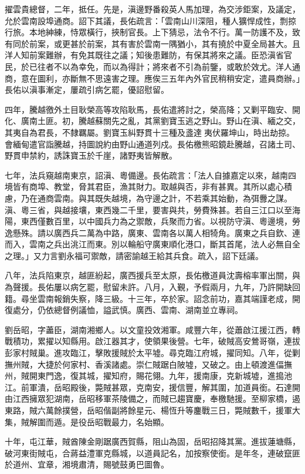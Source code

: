 \begin{pinyinscope}
擢雲貴總督，二年，抵任。先是，滇邊野番殺英人馬加理，為交涉鉅案，及議定，允於雲南設埠通商。詔下其議，長佑疏言：「雲南山川深阻，種人獷悍成性，剽掠行旅。本地紳練，恃眾橫行，挾制官長。上下猜忌，法令不行。萬一防護不及，致有同於前案，或更甚於前案，其有害於雲南一隅猶小，其有撓於中夏全局甚大。且洋人知前案難辦，有免其既往之議；知後患難防，有保其將來之議。臣恐滇省官民，於已往者不以為幸免，而以為得計；將來者不引為前鑒，或敢於效尤。洋人通商，意在圖利，亦斷無不思遠害之理。應俟三五年內外官民稍稍安定，遣員商辦。」長佑以滇事漸定，屢疏引病乞罷，優詔慰留。

四年，騰越徼外土目耿榮高等攻陷耿馬，長佑遣將討之，榮高降；又剿平臨安、開化、廣南土匪。初，騰越蘇關先之亂，其黨劉寶玉逃之野山。野山在滇、緬之交，其夷自為君長，不隸羈屬。劉寶玉糾野貫十三種及盞達夷伏羅坤山，時出劫掠。會緬甸遣官詣騰越，持圖說約由野山通道列戍。長佑檄熊昭鏡赴騰越，召諸土司、野貫申禁約，誘誅寶玉於千崖，諸野夷皆解散。

七年，法兵窺越南東京，詔滇、粵備邊。長佑疏言：「法人自據嘉定以來，越南四境皆有商埠、教堂，脅其君臣，漁其財力。取越與否，非有甚異。其所以處心積慮，乃在通商雲南。與其既失越境，為守邊之計，不若乘其始動，為弭釁之謀。滇、粵三省，與越接壤，東西幾二千里，要害與共，勞費殊甚。若自三江口以至海陽，東西僅數百里，以中國兵力為之禦敵，兵聚而力省。以視防守滇、粵邊境，勞逸懸殊。請以廣西兵二萬為中路，廣東、雲南各以萬人相犄角。廣東之兵自欽、連而入，雲南之兵出洮江而東。別以輪船守廣東順化港口，斷其首尾，法人必無自全之理。」又力言劉永福可禦敵，請密諭越王給其兵食。疏入，詔下廷議。

八年，法兵陷東京，越匪紛起，廣西援兵至太原，長佑檄道員沈壽榕率軍出關，與為聲援。長佑屢以病乞罷，慰留未許。八月，入覲，予假兩月，九年，乃許開缺回籍。尋坐雲南報銷失察，降三級。十三年，卒於家。詔念前功，嘉其端謹老成，開復處分，仍依總督例議恤，謚武慎。廣西、雲南、湖南並立專祠。

劉岳昭，字藎臣，湖南湘鄉人。以文童投效湘軍。咸豐六年，從蕭啟江援江西，轉戰積功，累擢以知縣用。啟江器其才，使領果後營。七年，破賊高安鶯哥嶺，連拔彭家村賊巢。進攻臨江，擊敗援賊於太平墟。尋克臨江府城，擢同知。八年，從剿撫州賊，大捷於何家村、香溪諸處。崇仁賊踞白陂墟，又破之。由上頓渡進偪撫州，賊開東門逸，復其城，擢知府，賜花翎。九年，援南康，克新城墟，進搗池江。前軍潰，岳昭殿後，斃賊甚眾，克南安，援信豐，解其圍，加道員銜。石達開由江西擁眾犯湖南，岳昭移軍茶陵備之，而賊已趨寶慶，奉檄馳援。至柳家橋，遏東路，賊六萬餘撲營，岳昭偕副將餘星元、楊恆升等鏖戰三日，斃賊數千，援軍大集，賊解圍而遁。是役岳昭戰最力，名始顯。

十年，屯江華，賊酋陳金剛踞廣西賀縣，阻山為固，岳昭招降其黨。進拔蓮塘縣，破河東街賊屯，合蔣益澧軍克縣城，以道員記名，加按察使銜。是年冬，連破竄匪於道州、宜章，湘境肅清，賜號鼓勇巴圖魯。


\end{pinyinscope}
